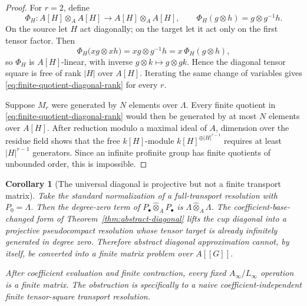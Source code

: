 \documentclass[11pt]{article}
\newtheorem{corollary}[theorem]{Corollary}
\theoremstyle{definition}
\begin{document}
\begin{proof}
For $r=2$, define
\[
\Phi_H:A[H]\otimes_A A[H]\longrightarrow A[H]\otimes_A A[H],
\qquad
\Phi_H(g\otimes h)=g\otimes g^{-1}h.
\]
On the source let $H$ act diagonally; on the target let it act only on the
first tensor factor.  Then
\[
\Phi_H\bigl(xg\otimes xh\bigr)
=xg\otimes g^{-1}h
=x\,\Phi_H(g\otimes h),
\]
so $\Phi_H$ is $A[H]$-linear, with inverse
$g\otimes k\mapsto g\otimes gk$.  Hence the diagonal tensor square is free of
rank $|H|$ over $A[H]$.  Iterating the same change of variables gives
\eqref{eq:finite-quotient-diagonal-rank} for every $r$.

Suppose $M_r$ were generated by $N$ elements over $\Lambda$.  Every finite
quotient in \eqref{eq:finite-quotient-diagonal-rank} would then be generated by
at most $N$ elements over $A[H]$.  After reduction modulo a maximal ideal of
$A$, dimension over the residue field shows that the free
$k[H]$-module $k[H]^{\oplus |H|^{r-1}}$ requires at least
$|H|^{r-1}$ generators.  Since an infinite profinite group has finite
quotients of unbounded order, this is impossible.
\end{proof}

\begin{corollary}[The universal diagonal is projective but not a finite transport matrix]\label{cor:universal-diagonal-not-finite-matrix}
Take the standard normalization of a full-transport resolution with
$P_0=\Lambda$.  Then the degree-zero term of
$P_\bullet\widehat\otimes_A P_\bullet$ is
$\Lambda\widehat\otimes_A\Lambda$.  The coefficient-base-changed form of
Theorem~\ref{thm:abstract-diagonal} lifts the cup diagonal into a projective
pseudocompact resolution whose tensor target is already infinitely generated
in degree zero.  Therefore abstract diagonal approximation cannot, by itself,
be converted into a finite matrix problem over $A[[G]]$.

After coefficient evaluation and finite contraction, every fixed $A_\infty/L_\infty$ operation is a finite matrix.  The obstruction is specifically to a naive
coefficient-independent finite tensor-square transport resolution.
\end{corollary}
\end{document}
